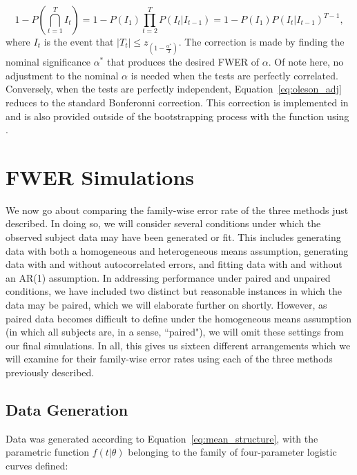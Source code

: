 \begin{equation}\label{eq:oleson_adj}
1 - P \left( \bigcap_{t=1}^T I_t \right) = 1 - P(I_1) \prod_{t=2}^T P(I_t | I_{t-1}) = 1 - P(I_1)P(I_t|I_{t-1})^{T-1},
\end{equation}
where $I_t$ is the event that $|T_t| \leq z_{\left(1 - \frac{\alpha^*}{2} \right)}$. The correction is made by finding the nominal significance $\alpha^*$ that produces the desired FWER of $\alpha$. Of note here, no adjustment to the nominal $\alpha$ is needed when the tests are perfectly correlated. Conversely, when the tests are perfectly independent, Equation~\ref{eq:oleson_adj} reduces to the standard Bonferonni correction. This correction is implemented in  and is also provided outside of the bootstrapping process with the function  using .

\section{FWER Simulations}

We now go about comparing the family-wise error rate of the three methods just described. In doing so, we will consider several conditions under which the observed subject data may have been generated or fit. This includes generating data with both a homogeneous and heterogeneous means assumption, generating data with and without autocorrelated errors, and fitting data with and without an AR(1) assumption. In addressing performance under paired and unpaired conditions, we have included two distinct but reasonable instances in which  the data may be paired, which we will elaborate further on shortly. However, as paired data becomes difficult to define under the homogeneous means assumption (in which all subjects are, in a sense, ``paired"), we will omit these settings from our final simulations. In all, this gives us sixteen different arrangements which we will examine for their family-wise error rates using each of the three methods previously described.



\subsection{Data Generation}

Data was generated according to Equation~\ref{eq:mean_structure}, with the parametric function $f(t|\theta)$ belonging to the family of four-parameter logistic curves defined:

